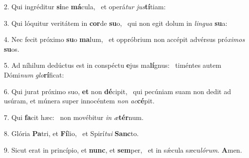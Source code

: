 2. Qui ingréditur \textbf{si}ne \textbf{má}cula, \ast\  et operá\textit{tur} \textit{jus}\textbf{tí}tiam:\

3. Qui lóquitur veritátem in \textbf{cor}de \textbf{su}o, \ast\  qui non egit dolum in \textit{lin}\textit{gua} \textbf{su}a:\

4. Nec fecit próximo \textbf{su}o \textbf{ma}lum, \ast\  et oppróbrium non accépit advérsus pró\textit{xi}\textit{mos} \textbf{su}os.\

5. Ad níhilum dedúctus est in conspéctu \textbf{e}jus ma\textbf{lí}gnus: \ast\  timéntes autem Dómi\textit{num} \textit{glo}\textbf{rí}ficat:\

6. Qui jurat próximo suo, \textbf{et} non \textbf{dé}cipit, \ast\  qui pecúniam suam non dedit ad usúram, et múnera super innocéntem \textit{non} \textit{ac}\textbf{cé}pit.\

7. Qui \textbf{fa}cit hæc: \ast\  non movébitur \textit{in} \textit{æ}\textbf{tér}num.\

8. Glória \textbf{Pa}tri, et \textbf{Fí}lio, \ast\  et Spirí\textit{tu}\textit{i} \textbf{Sanc}to.\

9. Sicut erat in princípio, et \textbf{nunc}, et \textbf{sem}per, \ast\  et in sǽcula sæcu\textit{ló}\textit{rum}. \textbf{A}men.\

